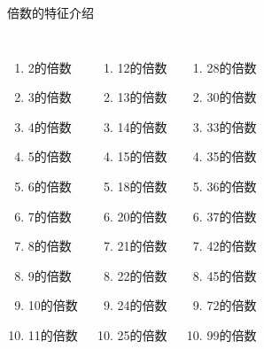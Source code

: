 \documentclass[aspectratio=169]{ctexbeamer} %
\date{\today}
\begin{document}
\begin{frame}[t]{倍数的特征介绍}
\begin{spacing}{1.1}
\normalsize
\begin{columns}
\begin{enumerate}[label={(\arabic*)、}, start=1]
\item 2的倍数
\item 3的倍数
\item 4的倍数
\item 5的倍数
\item 6的倍数
\item 7的倍数
\item 8的倍数
\item 9的倍数
\item 10的倍数
\item 11的倍数
\end{enumerate}

\begin{enumerate}[label={(\arabic*)、}, start=11]
\item 12的倍数
\item 13的倍数
\item 14的倍数
\item 15的倍数
\item 18的倍数
\item 20的倍数
\item 21的倍数
\item 22的倍数
\item 24的倍数
\item 25的倍数
\end{enumerate}

\begin{enumerate}[label={(\arabic*)、}, start=21]
\item 28的倍数
\item 30的倍数
\item 33的倍数
\item 35的倍数
\item 36的倍数
\item 37的倍数
\item 42的倍数
\item 45的倍数
\item 72的倍数
\item 99的倍数
\end{enumerate}

\end{columns}

\end{spacing}
\end{frame}
\end{document}
